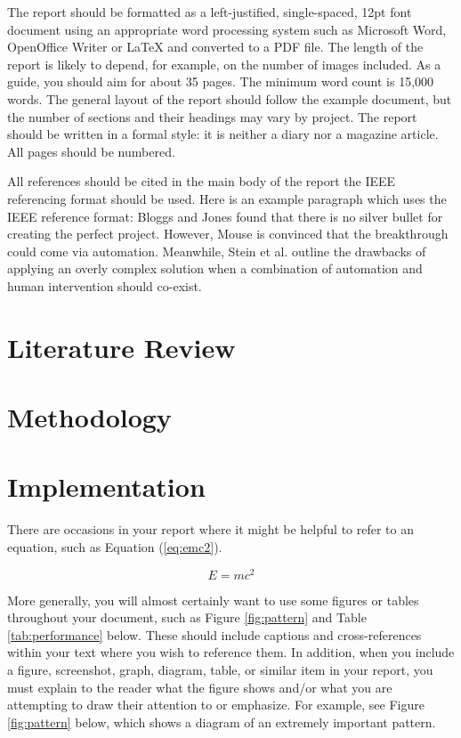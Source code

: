 \documentclass[12pt,a4paper]{article}
\begin{document}
The report should be formatted as a left-justified, single-spaced, 12pt font document using an appropriate word processing system such as Microsoft Word, OpenOffice Writer or LaTeX and converted to a PDF file. The length of the report is likely to depend, for example, on the number of images included. As a guide, you should aim for about 35 pages. The minimum word count is 15,000 words. The general layout of the report should follow the example document, but the number of sections and their headings may vary by project. The report should be written in a formal style: it is neither a diary nor a magazine article. All pages should be numbered.

All references should be cited in the main body of the report the IEEE referencing format should be used. Here is an example paragraph which uses the IEEE reference format: Bloggs and Jones \cite{bloggs2020} found that there is no silver bullet for creating the perfect project. However, Mouse \cite{mouse2112} is convinced that the breakthrough could come via automation. Meanwhile, Stein et al. \cite{stein2053} outline the drawbacks of applying an overly complex solution when a combination of automation and human intervention should co-exist.

\section{Literature Review}
\label{sec:literature-review}


\section{Methodology}
\label{sec:methodology}


\section{Implementation}
\label{sec:implementation}

There are occasions in your report where it might be helpful to refer to an equation, such as Equation (\ref{eq:emc2}).

\begin{equation}
E = mc^2
\label{eq:emc2}
\end{equation}

More generally, you will almost certainly want to use some figures or tables throughout your document, such as Figure \ref{fig:pattern} and Table \ref{tab:performance} below. These should include captions and cross-references within your text where you wish to reference them. In addition, when you include a figure, screenshot, graph, diagram, table, or similar item in your report, you must explain to the reader what the figure shows and/or what you are attempting to draw their attention to or emphasize. For example, see Figure \ref{fig:pattern} below, which shows a diagram of an extremely important pattern.
\end{document}
